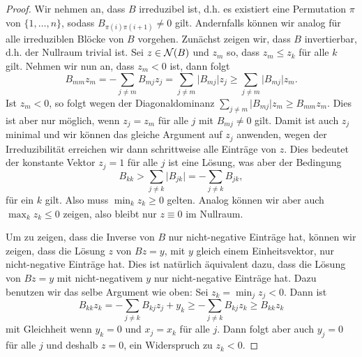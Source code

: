 \begin{proof}
Wir nehmen an, dass $B$ irreduzibel ist,  d.h. es existiert eine Permutation $\pi$ von $\{1,\ldots,n\}$, sodass $B_{\pi(i)\pi(i+1)} \neq 0$ gilt. Andernfalls k\"onnen wir analog f\"ur alle irreduziblen Bl\"ocke von $B$ vorgehen. Zun\"achst zeigen wir, dass $B$ invertierbar, d.h. der Nullraum trivial ist. Sei $z \in {\cal N}(B)$ und $z_m$ so, dass $z_m \leq z_k$ f\"ur alle $k$ gilt. Nehmen wir nun an, dass $z_m < 0$ ist, dann folgt
$$ B_{mm} z_m = - \sum_{j \neq m} B_{mj} z_j =   \sum_{j \neq m} \vert B_{mj} \vert  z_j \geq \sum_{j \neq m} \vert B_{mj} \vert  z_m . $$
Ist $z_m <0$, so folgt wegen der Diagonaldominanz  $\sum_{j \neq m} \vert B_{mj} \vert  z_m \geq B_{mm} z_m. $ Dies ist aber nur m\"oglich, wenn $z_j = z_m$ f\"ur alle $j$ mit $B_{mj} \neq 0$ gilt. Damit ist auch $z_j$ minimal und wir k\"onnen das gleiche Argument auf $z_j$ anwenden, wegen der Irreduzibilit\"at erreichen wir dann schrittweise alle Eintr\"age von $z$.   Dies bedeutet der konstante Vektor $z_j = 1$ f\"ur alle $j$ ist eine L\"osung, was aber der Bedingung 
$$  B_{kk} > \sum_{j \neq k} \vert B_{jk} \vert = - \sum_{j \neq k}  B_{jk},  $$
f\"ur ein $k$ gilt. Also muss $\min_k z_k\geq 0$ gelten. Analog k\"onnen wir aber auch $\max_k z_k \leq 0$ zeigen, also bleibt nur $z \equiv 0$ im Nullraum. 

Um zu zeigen, dass die Inverse von $B$ nur nicht-negative Einträge hat, k\"onnen wir zeigen, dass die L\"osung $z$ von $Bz=y$, mit $y$ gleich einem Einheitsvektor, nur nicht-negative Einträge hat. Dies ist nat\"urlich \"aquivalent dazu, dass die L\"osung von $Bz = y$ mit nicht-negativem $y$ nur nicht-negative Eintr\"age hat. Dazu benutzen wir das selbe Argument wie oben: Sei $z_k = \min_j z_j < 0$. Dann ist
$$ B_{kk} z_k = - \sum_{j\neq k} B_{kj} z_j + y_k \geq -  \sum_{j\neq k} B_{kj} z_k \geq B_{kk} z_k$$
mit Gleichheit wenn $y_k = 0$ und $x_j = x_k$ f\"ur alle $j$. Dann folgt aber auch $y_j =0$ für alle $j$ und deshalb $z = 0$, ein Widerspruch zu $z_k < 0$.
\end{proof}

